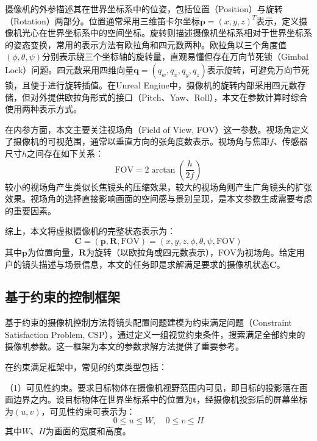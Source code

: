 摄像机的外参描述其在世界坐标系中的位姿，包括位置（Position）与旋转（Rotation）两部分。位置通常采用三维笛卡尔坐标$\mathbf{p} = (x, y, z)^T$表示，定义摄像机光心在世界坐标系中的空间坐标。旋转则描述摄像机坐标系相对于世界坐标系的姿态变换，常用的表示方法有欧拉角和四元数两种。欧拉角以三个角度值$(\phi, \theta, \psi)$分别表示绕三个坐标轴的旋转量，直观易懂但存在万向节死锁（Gimbal Lock）问题。四元数采用四维向量$\mathbf{q} = (q_w, q_x, q_y, q_z)$表示旋转，可避免万向节死锁，且便于进行旋转插值\cite{shoemake1985animating,hanson2005visualizing}。在Unreal Engine中，摄像机的旋转内部采用四元数存储，但对外提供欧拉角形式的接口（Pitch、Yaw、Roll），本文在参数计算时综合使用两种表示方式。

在内参方面，本文主要关注视场角（Field of View, FOV）这一参数。视场角定义了摄像机的可视范围，通常以垂直方向的张角度数表示。视场角与焦距$f$、传感器尺寸$h$之间存在如下关系：
\begin{equation}
\text{FOV} = 2 \arctan\left(\frac{h}{2f}\right)
\end{equation}
较小的视场角产生类似长焦镜头的压缩效果，较大的视场角则产生广角镜头的扩张效果。视场角的选择直接影响画面的空间感与景别呈现，是本文参数生成需要考虑的重要因素。

综上，本文将虚拟摄像机的完整状态表示为：
\begin{equation}
\mathbf{C} = (\mathbf{p}, \mathbf{R}, \text{FOV}) = (x, y, z, \phi, \theta, \psi, \text{FOV})
\end{equation}
其中$\mathbf{p}$为位置向量，$\mathbf{R}$为旋转（以欧拉角或四元数表示），FOV为视场角。给定用户的镜头描述与场景信息，本文的任务即是求解满足要求的摄像机状态$\mathbf{C}$。

\subsection{基于约束的控制框架}

基于约束的摄像机控制方法将镜头配置问题建模为约束满足问题（Constraint Satisfaction Problem, CSP），通过定义一组视觉约束条件，搜索满足全部约束的摄像机参数\cite{bares1999constraint}。这一框架为本文的参数求解方法提供了重要参考。

在约束满足框架中，常见的约束类型包括：

（1）可见性约束。要求目标物体在摄像机视野范围内可见，即目标的投影落在画面边界之内。设目标物体在世界坐标系中的位置为$\mathbf{t}$，经摄像机投影后的屏幕坐标为$(u, v)$，可见性约束可表示为：
\begin{equation}
0 \leq u \leq W, \quad 0 \leq v \leq H
\end{equation}
其中$W$、$H$为画面的宽度和高度。

